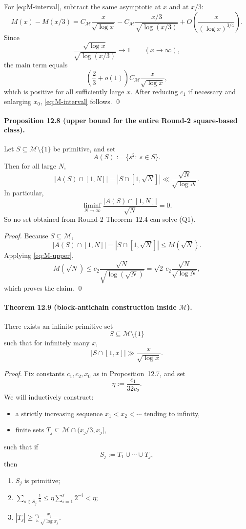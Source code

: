For \eqref{eq:M-interval}, subtract the same asymptotic at $x$ and at $x/3$:
\[
M(x)-M(x/3)
=
C_{\mathcal M}\frac{x}{\sqrt{\log x}}
-
C_{\mathcal M}\frac{x/3}{\sqrt{\log(x/3)}}
+
O\!\left(\frac{x}{(\log x)^{3/4}}\right).
\]
Since
\[
\frac{\sqrt{\log x}}{\sqrt{\log(x/3)}}\to 1
\qquad (x\to\infty),
\]
the main term equals
\[
\left(\frac23+o(1)\right)C_{\mathcal M}\frac{x}{\sqrt{\log x}},
\]
which is positive for all sufficiently large $x$.
After reducing $c_1$ if necessary and enlarging $x_0$, \eqref{eq:M-interval} follows.
\qed

\bigskip

\paragraph{\textbf{Proposition 12.8 (upper bound for the entire Round-2 square-based class).}}
Let $S\subseteq \mathcal M\setminus\{1\}$ be primitive, and set
\[
A(S):=\{s^2:\ s\in S\}.
\]
Then for all large $N$,
\[
|A(S)\cap[1,N]|
=
|S\cap[1,\sqrt N]|
\ll
\frac{\sqrt N}{\sqrt{\log N}}.
\]
In particular,
\[
\liminf_{N\to\infty}\frac{|A(S)\cap[1,N]|}{\sqrt N}=0.
\]
So no set obtained from Round-2 Theorem~12.4 can solve \textnormal{(Q1)}.

\emph{Proof.}
Because $S\subseteq \mathcal M$,
\[
|A(S)\cap[1,N]|=|S\cap[1,\sqrt N]|\le M(\sqrt N).
\]
Applying \eqref{eq:M-upper},
\[
M(\sqrt N)\le c_2\frac{\sqrt N}{\sqrt{\log(\sqrt N)}}
=
\sqrt 2\,c_2\frac{\sqrt N}{\sqrt{\log N}},
\]
which proves the claim.
\qed

\bigskip

\paragraph{\textbf{Theorem 12.9 (block-antichain construction inside $\mathcal M$).}}
There exists an infinite primitive set
\[
S\subseteq \mathcal M\setminus\{1\}
\]
such that for infinitely many $x$,
\[
|S\cap[1,x]|\gg \frac{x}{\sqrt{\log x}}.
\]

\emph{Proof.}
Fix constants $c_1,c_2,x_0$ as in Proposition~12.7, and set
\[
\eta:=\frac{c_1}{32c_2}.
\]
We will inductively construct:

\begin{itemize}
\item a strictly increasing sequence $x_1<x_2<\cdots$ tending to infinity,
\item finite sets $T_j\subseteq \mathcal M\cap (x_j/3,x_j]$,
\end{itemize}
such that if
\[
S_j:=T_1\cup\cdots\cup T_j,
\]
then
\begin{enumerate}
\item[(a)] $S_j$ is primitive;
\item[(b)] $\displaystyle \sum_{s\in S_j}\frac1s\le \eta\sum_{i=1}^j 2^{-i}<\eta$;
\item[(c)] $\displaystyle |T_j|\ge \frac{c_1}{5}\frac{x_j}{\sqrt{\log x_j}}$.
\end{enumerate}

